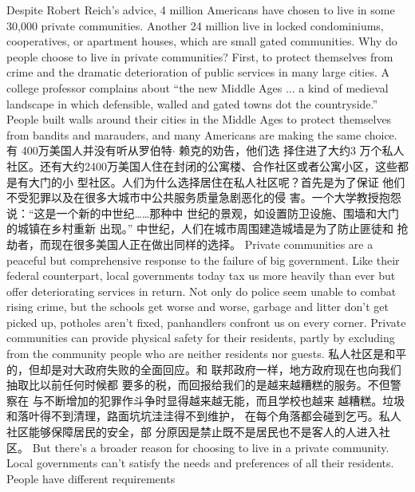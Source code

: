 \begin{paracol}{2}
Despite Robert Reich's advice, 4 million Americans have chosen
to live in some 30,000 private communities. Another 24 million live in locked condominiums, cooperatives, or apartment houses, which are small gated communities. Why do people choose to live in private communities? First, to protect themselves from crime and the dramatic deterioration of public services in many large cities. A college professor complains about
``the new Middle Ages ... a kind of medieval landscape in
which defensible, walled and gated towns dot the countryside.''
People built walls around their cities in the Middle Ages to protect themselves from bandits and marauders, and many Americans are making the same choice.
\switchcolumn
有 400万美国人并没有听从罗伯特$\cdot$ 赖克的劝告，他们选
择住进了大约3 万个私人社区。还有大约2400万美国人住在封闭的公寓楼、合作社区或者公寓小区，这些都是有大门的小
型社区。人们为什么选择居住在私人社区呢？首先是为了保证
他们不受犯罪以及在很多大城市中公共服务质量急剧恶化的侵
害。一个大学教授抱怨说：“这是一个新的中世纪……那种中
世纪的景观，如设置防卫设施、围墙和大门的城镇在乡村重新
出现。” 中世纪，人们在城市周围建造城墙是为了防止匪徒和
抢劫者，而现在很多美国人正在做出同样的选择。
\switchcolumn*
Private communities are a peaceful but comprehensive response to the failure of big government. Like their federal counterpart, local governments today tax us more heavily than ever
but offer deteriorating services in return. Not only do police
seem unable to combat rising crime, but the schools get worse
and worse, garbage and litter don't get picked up, potholes
aren't fixed, panhandlers confront us on every corner. Private
communities can provide physical safety for their residents,
partly by excluding from the community people who are neither residents nor guests.
\switchcolumn
私人社区是和平的，但却是对大政府失败的全面回应。和
联邦政府一样，地方政府现在也向我们抽取比以前任何时候都
要多的税，而回报给我们的是越来越糟糕的服务。不但警察在
与不断增加的犯罪作斗争时显得越来越无能，而且学校也越来
越糟糕。垃圾和落叶得不到清理，路面坑坑洼洼得不到维护，
在每个角落都会碰到乞丐。私人社区能够保障居民的安全，部
分原因是禁止既不是居民也不是客人的人进入社区。
\switchcolumn*
But there's a broader reason for choosing to live in a private
community. Local governments can't satisfy the needs and preferences of all their residents. People have different requirements

\end{paracol}
